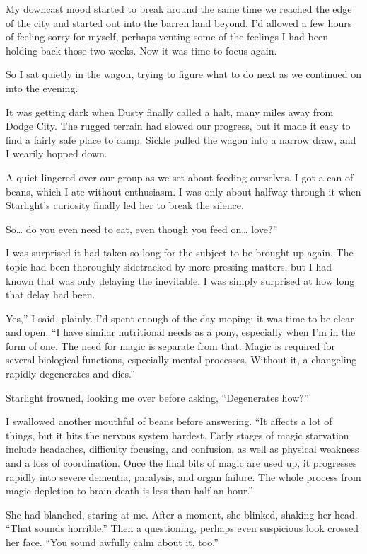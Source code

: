 My downcast mood started to break around the same time we reached the edge of the city and started out into the barren land beyond. I’d allowed a few hours of feeling sorry for myself, perhaps venting some of the feelings I had been holding back those two weeks. Now it was time to focus again.

So I sat quietly in the wagon, trying to figure what to do next as we continued on into the evening.

It was getting dark when Dusty finally called a halt, many miles away from Dodge City. The rugged terrain had slowed our progress, but it made it easy to find a fairly safe place to camp. Sickle pulled the wagon into a narrow draw, and I wearily hopped down.

A quiet lingered over our group as we set about feeding ourselves. I got a can of beans, which I ate without enthusiasm. I was only about halfway through it when Starlight’s curiosity finally led her to break the silence.

\leavevmode{}So… do you even need to eat, even though you feed on… love?”

I was surprised it had taken so long for the subject to be brought up again. The topic had been thoroughly sidetracked by more pressing matters, but I had known that was only delaying the inevitable. I was simply surprised at how long that delay had been.

\leavevmode{}Yes,” I said, plainly. I’d spent enough of the day moping; it was time to be clear and open. “I have similar nutritional needs as a pony, especially when I’m in the form of one. The need for magic is separate from that. Magic is required for several biological functions, especially mental processes. Without it, a changeling rapidly degenerates and dies.”

Starlight frowned, looking me over before asking, “Degenerates how?”

I swallowed another mouthful of beans before answering. “It affects a lot of things, but it hits the nervous system hardest. Early stages of magic starvation include headaches, difficulty focusing, and confusion, as well as physical weakness and a loss of coordination. Once the final bits of magic are used up, it progresses rapidly into severe dementia, paralysis, and organ failure. The whole process from magic depletion to brain death is less than half an hour.”

She had blanched, staring at me. After a moment, she blinked, shaking her head. “That sounds horrible.” Then a questioning, perhaps even suspicious look crossed her face. “You sound awfully calm about it, too.”

